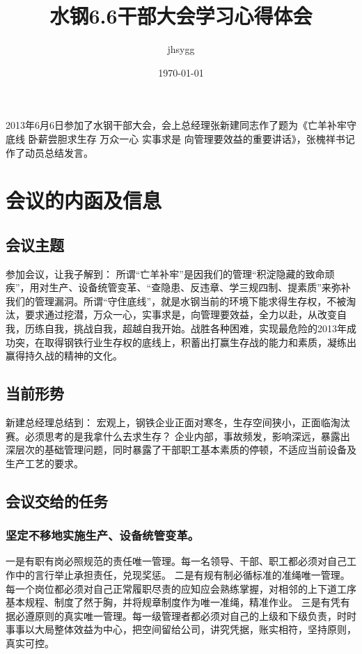 \documentclass[11pt]{article}
\title{水钢6.6干部大会学习心得体会}
\author{jhsygg}
\date{\today}
\begin{document}
\maketitle

\setcounter{tocdepth}{3}
\tableofcontents
\vspace*{1cm}

2013年6月6日参加了水钢干部大会，会上总经理张新建同志作了题为《亡羊补牢守底线 卧薪尝胆求生存 万众一心 实事求是 向管理要效益的重要讲话》，张槐祥书记作了动员总结发言。
\section{会议的内函及信息}
\label{sec-1}
\subsection{会议主题}
\label{sec-1-1}

参加会议，让我子解到：
所谓“亡羊补牢”是因我们的管理“积淀隐藏的致命顽疾”，用对生产、设备统管变革、“查隐患、反违章、学三规四制、提素质”来弥补我们的管理漏洞。所谓“守住底线”，就是水钢当前的环境下能求得生存权，不被淘汰，要求通过挖潜，万众一心，实事求是，向管理要效益，全力以赴，从改变自我，历练自我，挑战自我，超越自我开始。战胜各种困难，实现最危险的2013年成功突，在取得钢铁行业生存权的底线上，积蓄出打赢生存战的能力和素质，凝练出赢得持久战的精神的文化。
\subsection{当前形势}
\label{sec-1-2}

新建总经理总结到：
宏观上，钢铁企业正面对寒冬，生存空间狭小，正面临淘汰赛。必须思考的是我拿什么去求生存？
企业内部，事故频发，影响深远，暴露出深层次的基础管理问题，同时暴露了干部职工基本素质的停顿，不适应当前设备及生产工艺的要求。
\subsection{会议交给的任务}
\label{sec-1-3}
\subsubsection{坚定不移地实施生产、设备统管变革。}
\label{sec-1-3-1}

一是有职有岗必照规范的责任唯一管理。每一名领导、干部、职工都必须对自己工作中的言行举止承担责任，兑现奖惩。
二是有规有制必循标准的准绳唯一管理。每一个岗位都必须对自己正常履职尽责的应知应会熟练掌握，对相邻的上下道工序基本规程、制度了然于胸，并将规章制度作为唯一准绳，精准作业。
三是有凭有据必遵原则的真实唯一管理。每一级管理者都必须对自己的上级和下级负责，时时事事以大局整体效益为中心，把空间留给公司，讲究凭据，账实相符，坚持原则，真实可控。
\end{document}
